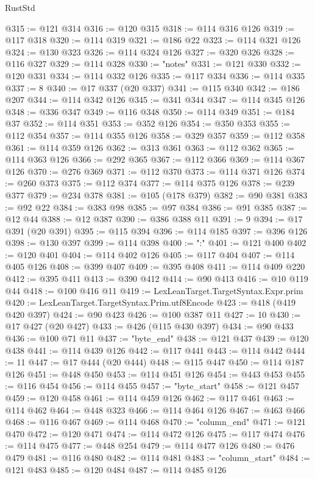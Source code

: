 \begin{lexlean}{RustStd}
\begin{coremodule}
{\begin{coremodule}
{{{{{{{{{{{{{{{{{{{{{{{{{{{{{{{{{{{{{{{{{{{{{{{{{{@315 := @121 @314
@316 := @120 @315
@318 := @114 @316 @126
@319 := @117 @318
@320 := @114 @319
@321 := @186 @22
@323 := @114 @321 @126
@324 := @130 @323
@326 := @114 @324 @126
@327 := @320 @326
@328 := @116 @327
@329 := @114 @328
@330 := "notes"
@331 := @121 @330
@332 := @120 @331
@334 := @114 @332 @126
@335 := @117 @334
@336 := @114 @335
@337 := 8
@340 := @17 @337 (@20 @337)
@341 := @115 @340
@342 := @186 @207
@344 := @114 @342 @126
@345 := @341 @344
@347 := @114 @345 @126
@348 := @336 @347
@349 := @116 @348
@350 := @114 @349
@351 := @184 @37
@352 := @114 @351
@353 := @352 @126
@354 := @350 @353
@355 := @112 @354
@357 := @114 @355 @126
@358 := @329 @357
@359 := @112 @358
@361 := @114 @359 @126
@362 := @313 @361
@363 := @112 @362
@365 := @114 @363 @126
@366 := @292 @365
@367 := @112 @366
@369 := @114 @367 @126
@370 := @276 @369
@371 := @112 @370
@373 := @114 @371 @126
@374 := @260 @373
@375 := @112 @374
@377 := @114 @375 @126
@378 := @239 @377
@379 := @234 @378
@381 := @105 (@178 @379)
@382 := @90 @381
@383 := @92 @22
@384 := @383 @98
@385 := @97 @384
@386 := @91 @385
@387 := @12 @44
@388 := @12 @387
@390 := @386 @388 @11
@391 := 9
@394 := @17 @391 (@20 @391)
@395 := @115 @394
@396 := @114 @185
@397 := @396 @126
@398 := @130 @397
@399 := @114 @398
@400 := ":"
@401 := @121 @400
@402 := @120 @401
@404 := @114 @402 @126
@405 := @117 @404
@407 := @114 @405 @126
@408 := @399 @407
@409 := @395 @408
@411 := @114 @409 @220
@412 := @395 @411
@413 := @390 @412
@414 := @90 @413
@416 := @10 @119 @44
@418 := @100 @416 @11
@419 := LexLeanTarget.TargetSyntax.Expr.prim
@420 := LexLeanTarget.TargetSyntax.Prim.utf8Encode
@423 := @418 (@419 @420 @397)
@424 := @90 @423
@426 := @100 @387 @11
@427 := 10
@430 := @17 @427 (@20 @427)
@433 := @426 (@115 @430 @397)
@434 := @90 @433
@436 := @100 @71 @11
@437 := "byte_end"
@438 := @121 @437
@439 := @120 @438
@441 := @114 @439 @126
@442 := @117 @441
@443 := @114 @442
@444 := 11
@447 := @17 @444 (@20 @444)
@448 := @115 @447
@450 := @114 @187 @126
@451 := @448 @450
@453 := @114 @451 @126
@454 := @443 @453
@455 := @116 @454
@456 := @114 @455
@457 := "byte_start"
@458 := @121 @457
@459 := @120 @458
@461 := @114 @459 @126
@462 := @117 @461
@463 := @114 @462
@464 := @448 @323
@466 := @114 @464 @126
@467 := @463 @466
@468 := @116 @467
@469 := @114 @468
@470 := "column_end"
@471 := @121 @470
@472 := @120 @471
@474 := @114 @472 @126
@475 := @117 @474
@476 := @114 @475
@477 := @448 @254
@479 := @114 @477 @126
@480 := @476 @479
@481 := @116 @480
@482 := @114 @481
@483 := "column_start"
@484 := @121 @483
@485 := @120 @484
@487 := @114 @485 @126
}}}}}}}}}}}}}}}}}}}}}}}}}}}}}}}}}}}}}}}}}}}}}}}}}}
\end{coremodule}}
\end{coremodule}
\end{lexlean}
